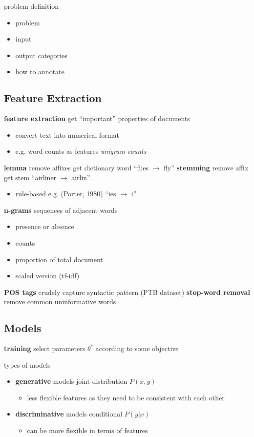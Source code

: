 \documentclass[]{article}
\theoremstyle{definition}
\begin{document}
problem definition
\begin{itemize}
    \item problem
    \item input
    \item output categories
    \item how to annotate
\end{itemize}

\subsection{Feature Extraction}%
\label{ssub:feature_extraction}


\textbf{feature extraction} get ``important'' properties of documents
\begin{itemize}
    \item convert text into numerical format
    \item e.g. word counts as features \textit{unigram counts}
\end{itemize}

\textbf{lemma} remove affixes get dictionary word ``flies $\to$ fly''
\textbf{stemming} remove affix get stem ``airliner $\to$ airlin''
\begin{itemize}
    \item rule-based e.g. (Porter, 1980) ``ies $\to$ i''
\end{itemize}
\textbf{n-grams} sequences of adjacent words
\begin{itemize}
    \item presence or absence
    \item counts
    \item proportion of total document
    \item scaled version (tf-idf)
\end{itemize}
\textbf{POS tags} crudely capture syntactic pattern (PTB dataset)
\textbf{stop-word removal} remove common uninformative words

\subsection{Models}%
\label{sub:models}

\textbf{training} select parameters $\theta^*$ according to some objective

types of models
\begin{itemize}
    \item \textbf{generative} models joint distribution $P(x, y)$
        \begin{itemize}
            \item less flexible features as they need to be consistent with each other
        \end{itemize}
    \item \textbf{discriminative} models conditional $P(y|x)$
        \begin{itemize}
            \item can be more flexible in terms of features
        \end{itemize}
\end{itemize}
\end{document}
